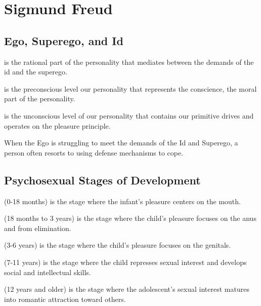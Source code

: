 \section{Sigmund Freud}

\subsection{Ego, Superego, and Id}

\begin{coloredlist}
    \item {} is the rational part of the personality that mediates between the demands of the id and the superego.
    \item {} is the preconscious level our personality that represents the conscience, the moral part of the personality.
    \item {} is the unconscious level of our personality that contains our primitive drives and operates on the pleasure principle.
    \item When the Ego is struggling to meet the demands of the Id and Superego, a person often resorts to using defense mechanisms to cope.
\end{coloredlist}

\subsection{Psychosexual Stages of Development}

\begin{coloredlist}
    \item {} (0-18 months) is the stage where the infant's pleasure centers on the mouth.
    \item {} (18 months to 3 years) is the stage where the
    child's pleasure focuses on the anus and from elimination.
    \item {} (3-6 years) is the stage where the child's pleasure focuses on the genitals.
    \item {} (7-11 years) is the stage where the child represses sexual interest and develops social and intellectual skills.
    \item {} (12 years and older) is the stage where the adolescent's sexual interest matures into romantic attraction toward others.
\end{coloredlist}